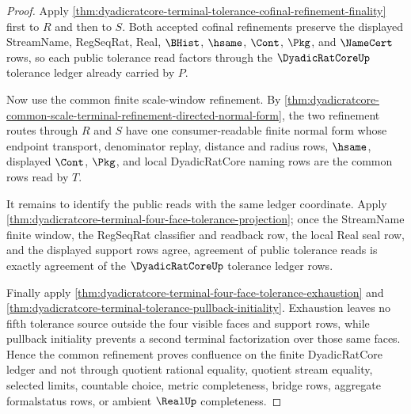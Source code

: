 \begin{proof}
Apply \autoref{thm:dyadicratcore-terminal-tolerance-cofinal-refinement-finality} first to $R$ and then to $S$. Both accepted cofinal refinements preserve the displayed StreamName, RegSeqRat, Real, $\BHist$, $\hsame$, $\Cont$, $\Pkg$, and $\NameCert$ rows, so each public tolerance read factors through the $\DyadicRatCoreUp$ tolerance ledger already carried by $P$.

Now use the common finite scale-window refinement. By \autoref{thm:dyadicratcore-common-scale-terminal-refinement-directed-normal-form}, the two refinement routes through $R$ and $S$ have one consumer-readable finite normal form whose endpoint transport, denominator replay, distance and radius rows, $\hsame$, displayed $\Cont$, $\Pkg$, and local DyadicRatCore naming rows are the common rows read by $T$.

It remains to identify the public reads with the same ledger coordinate. Apply \autoref{thm:dyadicratcore-terminal-four-face-tolerance-projection}; once the StreamName finite window, the RegSeqRat classifier and readback row, the local Real seal row, and the displayed support rows agree, agreement of public tolerance reads is exactly agreement of the $\DyadicRatCoreUp$ tolerance ledger rows.

Finally apply \autoref{thm:dyadicratcore-terminal-four-face-tolerance-exhaustion} and \autoref{thm:dyadicratcore-terminal-tolerance-pullback-initiality}. Exhaustion leaves no fifth tolerance source outside the four visible faces and support rows, while pullback initiality prevents a second terminal factorization over those same faces. Hence the common refinement proves confluence on the finite DyadicRatCore ledger and not through quotient rational equality, quotient stream equality, selected limits, countable choice, metric completeness, bridge rows, aggregate formalstatus rows, or ambient $\RealUp$ completeness.
\end{proof}

